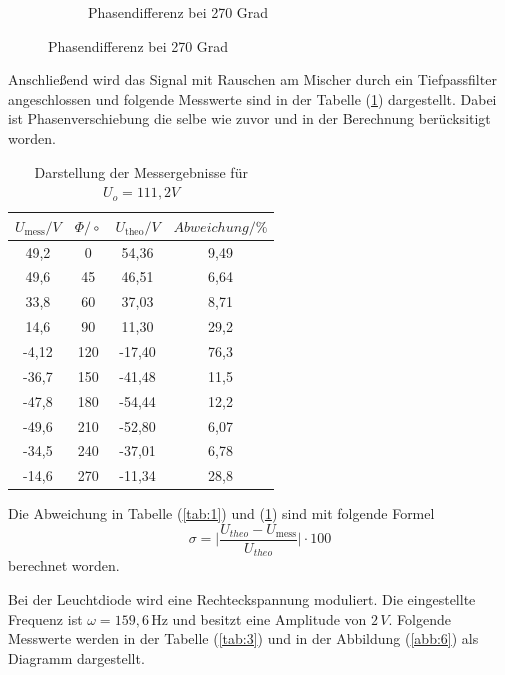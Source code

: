 \begin{figure}[H]
\begin{subfigure}{0.48\textwidth}
  \caption{Phasendifferenz bei 270 Grad}
\end{subfigure}
\end{figure}

Anschließend wird das Signal mit Rauschen am Mischer durch ein Tiefpassfilter angeschlossen und folgende
Messwerte sind in der Tabelle (\ref{tab:2}) dargestellt.
Dabei ist Phasenverschiebung die selbe wie zuvor und in der Berechnung berücksitigt worden.
\begin{table}[H]
\centering
\caption{Darstellung der Messergebnisse für $U_o =111,2 V$}
\label{tab:2}
 \begin{tabular}{c c c c}
  \toprule
     $U_\text{mess} / V$ & $\Phi/\circ$ & $U_\text{theo} / V$ & $Abweichung/ \%$ \\
  \midrule
  49,2  & 0  & 	54,36 & 9,49 \\
  49,6  & 45 &  46,51 & 6,64 \\
  33,8  & 60 &  37,03 & 8,71 \\
  14,6  & 90 &  11,30 & 29,2 \\
  -4,12 & 120& -17,40 & 76,3 \\
  -36,7 & 150& -41,48 & 11,5 \\
  -47,8 & 180& -54,44 & 12,2 \\
  -49,6 & 210& -52,80 & 6,07 \\
  -34,5 & 240& -37,01 & 6,78 \\
  -14,6 & 270& -11,34 & 28,8 \\
  \bottomrule
\end{tabular}
\end{table}

Die Abweichung in Tabelle (\ref{tab:1}) und (\ref{tab:2}) sind mit folgende Formel
\begin{equation*}
  \sigma = \biggl| \frac{U_{theo}-U_\text{mess}}{U_{theo}} \biggl| \cdot 100
\end{equation*}
berechnet worden.

Bei der Leuchtdiode wird eine Rechteckspannung moduliert. Die eingestellte Frequenz ist $\omega = 159,6 \, \si{\hertz}$ und
besitzt eine Amplitude von $2 \, V$.
Folgende Messwerte werden in der Tabelle (\ref{tab:3}) und in der Abbildung (\ref{abb:6}) als
Diagramm dargestellt.

